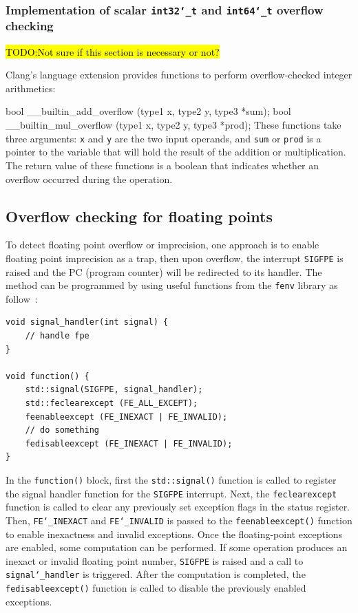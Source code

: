 \documentclass[logo,bsc,singlespacing,parskip]{infthesis}
\newcommand{\sigfpe}{\texttt{SIGFPE}}
\newcommand{\dtint}{\texttt{int32\char`_t}}
\newcommand{\dtlong}{\texttt{int64\char`_t}}
\newcommand{\feinexact}{\texttt{FE\char`_INEXACT}}
\newcommand{\feinvalid}{\texttt{FE\char`_INVALID}}
\newenvironment{VerbatimCompact}
  {\vspace*{-2.5mm}\VerbatimEnvironment
   \par\Verbatim}
  {\endVerbatim\vspace*{-2.4mm}}
\begin{document}
\subsubsection{Implementation of scalar \dtint{} and \dtlong{}
overflow checking} 

\hl{TODO:Not sure if this section is necessary or not?}

Clang's language extension provides functions to perform overflow-checked
integer arithmetics: 
\begin{VerbatimCompact}
bool __builtin_add_overflow (type1 x, type2 y, type3 *sum);
bool __builtin_mul_overflow (type1 x, type2 y, type3 *prod);
\end{VerbatimCompact}
These functions take three arguments: \texttt{x} and \texttt{y} are the two
input operands, and \texttt{sum} or \texttt{prod} is a pointer to the variable
that will hold the result of the addition or multiplication. The return value of
these functions is a boolean that indicates whether an overflow occurred during
the operation.


\subsection{Overflow checking for floating points}
\label{sec:overflow-float}
To detect floating point overflow or imprecision, one approach is to enable
floating point imprecision as a trap, then upon overflow, the interrupt \sigfpe{}
is raised and the PC (program counter) will be redirected to its handler. The
method can be programmed by using useful functions from the \texttt{fenv}
library as follow~\cite{fenvlib}:
\begin{verbatim}
void signal_handler(int signal) {
    // handle fpe
}

void function() {
    std::signal(SIGFPE, signal_handler);
    std::feclearexcept (FE_ALL_EXCEPT);
    feenableexcept (FE_INEXACT | FE_INVALID);
    // do something
    fedisableexcept (FE_INEXACT | FE_INVALID);
}
\end{verbatim}

In the \texttt{function()} block, first the \texttt{std::signal()} function is
called to register the signal handler function for the \sigfpe{} interrupt. Next,
the \texttt{feclearexcept} function is called to clear any previously set
exception flags in the status register. Then, \feinexact{} and \feinvalid{} is
passed to the \texttt{feenableexcept()} function to enable inexactness and
invalid exceptions. Once the floating-point exceptions are enabled, some
computation can be performed. If some operation produces an inexact or invalid
floating point number, \sigfpe{} is raised and a call to
\texttt{signal\char`_handler} is triggered. After the computation is completed,
the \texttt{fedisableexcept()} function is called to disable the previously
enabled exceptions. 
\end{document}
